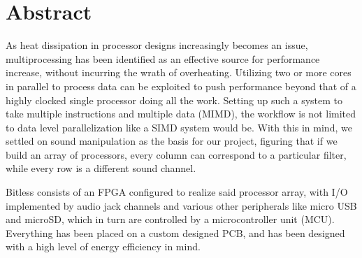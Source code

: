 
\section*{Abstract}
As heat dissipation in processor designs increasingly becomes an issue,
multiprocessing has been identified as an effective source for performance
increase, without incurring the wrath of overheating. Utilizing two or more
cores in parallel to process data can be exploited to push performance beyond
that of a highly clocked single processor doing all the work. Setting up such
a system to take multiple instructions and multiple data (MIMD), the workflow
is not limited to data level parallelization like a SIMD system would be. With
this in mind, we settled on sound manipulation as the basis for our project,
figuring that if we build an array of processors, every column can correspond
to a particular filter, while every row is a different sound channel.
\newline

Bitless consists of an FPGA configured to realize said processor array, with
I/O implemented by audio jack channels and various other peripherals like micro
USB and microSD, which in turn are controlled by a microcontroller unit (MCU).
Everything has been placed on a custom designed PCB, and has been designed with
a high level of energy efficiency in mind.
\newline

